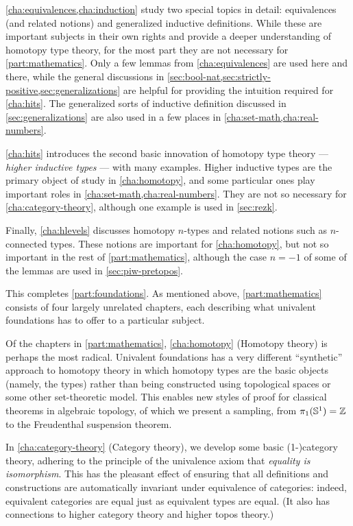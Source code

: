 \autoref{cha:equivalences,cha:induction} study two special topics in detail: equivalences (and related notions) and generalized inductive definitions.
While these are important subjects in their own rights and provide a deeper understanding of homotopy type theory, for the most part they are not necessary for \autoref{part:mathematics}.
Only a few lemmas from \autoref{cha:equivalences} are used here and there, while the general discussions in \autoref{sec:bool-nat,sec:strictly-positive,sec:generalizations} are helpful for providing the intuition required for \autoref{cha:hits}.
The generalized sorts of inductive definition discussed in \autoref{sec:generalizations} are also used in a few places in \autoref{cha:set-math,cha:real-numbers}.

\autoref{cha:hits} introduces the second basic innovation of homotopy type theory --- \emph{higher inductive types} --- with many examples.
Higher inductive types are the primary object of study in \autoref{cha:homotopy}, and some particular ones play important roles in \autoref{cha:set-math,cha:real-numbers}.
They are not so necessary for \autoref{cha:category-theory}, although one example is used in \autoref{sec:rezk}.

Finally, \autoref{cha:hlevels} discusses homotopy $n$-types and related notions such as $n$-connected types.
These notions are important for \autoref{cha:homotopy}, but not so important in the rest of \autoref{part:mathematics}, although the case $n=-1$ of some of the lemmas are used in \autoref{sec:piw-pretopos}.

This completes \autoref{part:foundations}.
As mentioned above, \autoref{part:mathematics} consists of four largely unrelated chapters, each describing what univalent foundations has to offer to a particular subject.

Of the chapters in \autoref{part:mathematics}, \autoref{cha:homotopy} (Homotopy theory) is perhaps the most radical.
Univalent foundations has a very different ``synthetic'' approach to homotopy theory in which homotopy types are the basic objects (namely, the types) rather than being constructed using topological spaces or some other set-theoretic model.
This enables new styles of proof for classical theorems in algebraic topology, of which we present a sampling, from $\pi_1(\mathbb{S}^1)=\mathbb{Z}$ to the Freudenthal suspension theorem.

In \autoref{cha:category-theory} (Category theory), we develop some basic (1-)category theory, adhering to the principle of the univalence axiom that \emph{equality is isomorphism}.
This has the pleasant effect of ensuring that all definitions and constructions are automatically invariant under equivalence of categories: indeed, equivalent categories are equal just as equivalent types are equal.
(It also has connections to higher category theory and higher topos theory.)

